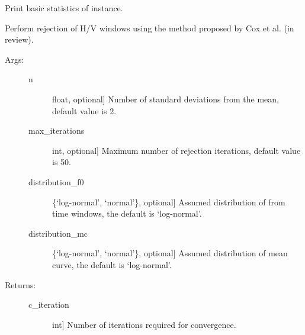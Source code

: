 \documentclass[letterpaper,10pt,english,openany,oneside]{sphinxmanual}
\begin{document}
\begin{fulllineitems}
\begin{fulllineitems}
\end{fulllineitems}


\begin{fulllineitems}
\label{\detokenize{index:hvsrpy.Hvsr.print_stats}}
Print basic statistics of  instance.

\end{fulllineitems}


\begin{fulllineitems}
\label{\detokenize{index:hvsrpy.Hvsr.reject_windows}}
Perform rejection of H/V windows using the method proposed by
Cox et al. (in review).
\begin{description}
\item[{Args:}] \leavevmode\begin{description}
\item[{n}] \leavevmode{[}float, optional{]}
Number of standard deviations from the mean, default
value is 2.

\item[{max\_iterations}] \leavevmode{[}int, optional{]}
Maximum number of rejection iterations, default value is
50.

\item[{distribution\_f0}] \leavevmode{[}\{‘log-normal’, ‘normal’\}, optional{]}
Assumed distribution of  from time windows, the
default is ‘log-normal’.

\item[{distribution\_mc}] \leavevmode{[}\{‘log-normal’, ‘normal’\}, optional{]}
Assumed distribution of mean curve, the default is
‘log-normal’.

\end{description}

\item[{Returns:}] \leavevmode\begin{description}
\item[{c\_iteration}] \leavevmode{[}int{]}
Number of iterations required for convergence.


\end{description}
\end{description}
\end{fulllineitems}
\end{fulllineitems}
\end{document}
